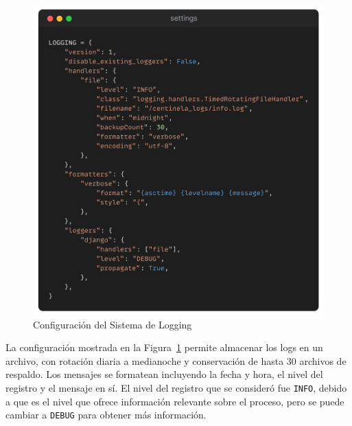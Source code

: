\begin{figure}[H]
    \centering
    \includegraphics[scale=0.15]{../02Figures/02Chapter/Sprints/Sprint-5/logging.png}
    \caption{Configuración del Sistema de Logging}\label{fig:logging}
\end{figure}

La configuración mostrada en la Figura~\ref{fig:logging} permite almacenar los logs en un archivo, con rotación diaria a medianoche y conservación de hasta 30 archivos de respaldo.
Los mensajes se formatean incluyendo la fecha y hora, el nivel del registro y el mensaje en sí.
El nivel del registro que se consideró fue \texttt{INFO}, debido a que es el nivel que ofrece información relevante sobre el proceso, pero se puede cambiar a \texttt{DEBUG} para obtener más información.

